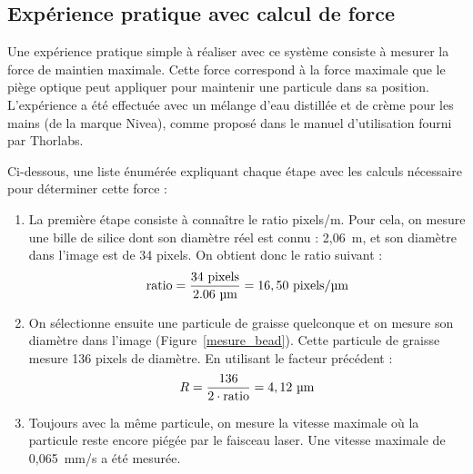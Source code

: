\subsection{Expérience pratique avec calcul de force}
Une expérience pratique simple à réaliser avec ce système consiste à mesurer la force de maintien maximale. Cette force correspond à la force maximale que le piège optique peut appliquer pour maintenir une particule dans sa position. L'expérience a été effectuée avec un mélange d'eau distillée et de crème pour les mains (de la marque Nivea), comme proposé dans le manuel d'utilisation fourni par Thorlabs.

Ci-dessous, une liste énumérée expliquant chaque étape avec les calculs nécessaire pour déterminer cette force :

\vspace{1em}
\begin{minipage}{0.6\textwidth}
    \begin{enumerate}
        \item La première étape consiste à connaître le ratio pixels/\textmu m. Pour cela, on mesure une bille de silice dont son diamètre réel est connu : 2,06~\textmu m, et son diamètre dans l'image est de 34 pixels. On obtient donc le ratio suivant :
              \[
                  \text{ratio} = \frac{34~\text{pixels}}{2.06~\text{\textmu m}} = 16,50~\text{pixels/\textmu m}
              \]
        \item On sélectionne ensuite une particule de graisse quelconque et on mesure son diamètre dans l'image (Figure~\ref{mesure_bead}). Cette particule de graisse mesure 136 pixels de diamètre. En utilisant le facteur précédent :
              \[
                  R = \frac{136}{2 \cdot \text{ratio}} = 4,12~\text{\textmu m}
              \]
        \item Toujours avec la même particule, on mesure la vitesse maximale où la particule reste encore piégée par le faisceau laser. Une vitesse maximale de 0,065~mm/s a été mesurée.
    \end{enumerate}
\end{minipage}
\hfill
